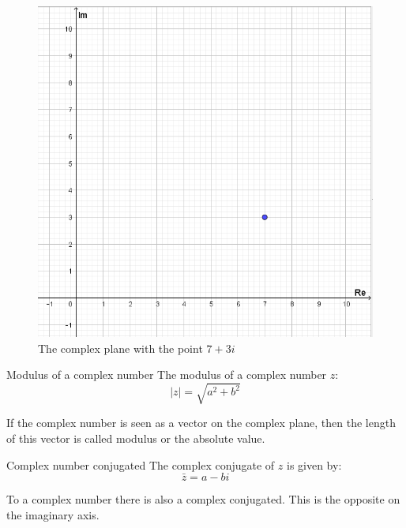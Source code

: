 \begin{figure}[H]
\centering
\includegraphics[scale=0.4]{fig/img/complex_plan}
\caption{The complex plane with the point $7+3i$}
\end{figure}

\begin{definition}{Modulus of a complex number}{}
The modulus of a complex number $z$:
$$\mid z\mid=\sqrt{a^2+b^2}$$
\end{definition}

If the complex number is seen as a vector on the complex plane, then the length of this vector is called modulus or the absolute value.

\begin{definition}{Complex number conjugated}{}
The complex conjugate of $z$ is given by:
$$\bar{z}=a-bi$$
\end{definition} 

To a complex number there is also a complex conjugated. This is the opposite on the imaginary axis.  

